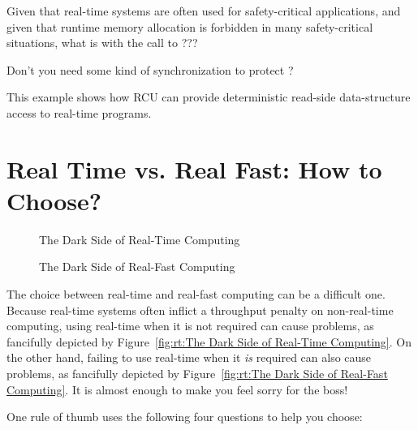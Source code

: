\QuickQuiz{}
	Given that real-time systems are often used for safety-critical
	applications, and given that runtime memory allocation is
	forbidden in many safety-critical situations, what is with
	the call to ???
 \QuickQuizEnd

\QuickQuiz{}
	Don't you need some kind of synchronization to protect
	?
 \QuickQuizEnd

This example shows how RCU can provide deterministic read-side
data-structure access to real-time programs.

\section{Real Time vs. Real Fast: How to Choose?}
\label{sec:rt:Real Time vs. Real Fast: How to Choose?}

\begin{figure}[tb]
\centering
{}
\caption{The Dark Side of Real-Time Computing}
\end{figure}

\begin{figure}[tb]
\centering
{}
\caption{The Dark Side of Real-Fast Computing}
\end{figure}

The choice between real-time and real-fast computing can be a difficult one.
Because real-time systems often inflict a throughput penalty on non-real-time
computing, using real-time when it is not required can cause problems,
as fancifully depicted by
Figure~\ref{fig:rt:The Dark Side of Real-Time Computing}.
On the other hand, failing to use real-time when it \emph{is} required
can also cause problems, as fancifully depicted by
Figure~\ref{fig:rt:The Dark Side of Real-Fast Computing}.
It is almost enough to make you feel sorry for the boss!

One rule of thumb uses the following four questions to help you choose:

